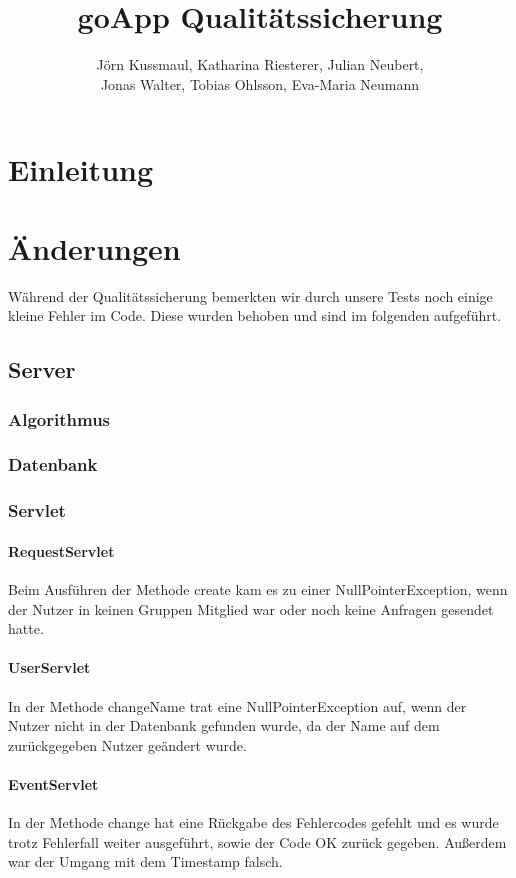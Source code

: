 \documentclass{scrartcl}
\title{goApp Qualitätssicherung}
\author{Jörn Kussmaul, Katharina Riesterer, Julian Neubert,\\ Jonas Walter, Tobias Ohlsson, Eva-Maria Neumann}
\begin{document}
	\maketitle
	\newpage
	\tableofcontents
	\newpage

\section{Einleitung}
\newpage
\section{Änderungen}
Während der Qualitätssicherung bemerkten wir durch unsere Tests noch einige kleine Fehler im Code. Diese wurden behoben und sind im folgenden aufgeführt.
\subsection{Server}
\subsubsection{Algorithmus}
\subsubsection{Datenbank}
\subsubsection{Servlet}
\paragraph{RequestServlet}
Beim Ausführen der Methode create kam es zu  einer NullPointerException, wenn der Nutzer in keinen Gruppen Mitglied war oder noch keine Anfragen gesendet hatte.
\paragraph{UserServlet}
In der Methode changeName trat eine NullPointerException auf, wenn der Nutzer nicht in der Datenbank gefunden wurde, da der Name auf dem zurückgegeben Nutzer geändert wurde.
\paragraph{EventServlet}
In der Methode change hat eine Rückgabe des Fehlercodes gefehlt und es wurde trotz Fehlerfall weiter ausgeführt, sowie der Code OK zurück gegeben.
Außerdem war der Umgang mit dem Timestamp falsch.
\newpage
\end{document}
